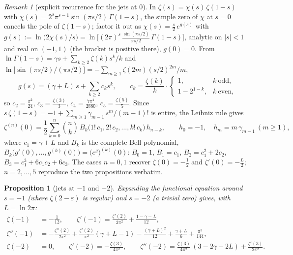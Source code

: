 \documentclass[11pt]{article}
\newtheorem{proposition}[theorem]{Proposition}
\theoremstyle{remark}
\newtheorem{remark}[theorem]{Remark}
\newcommand{\lntwopi}{\ln 2\pi}
\begin{document}
\begin{remark}[explicit recurrence for the jets at $0$]\label{rem:jetrec}
In $\zeta(s)=\chi(s)\,\zeta(1-s)$ with
$\chi(s)=2^s\pi^{s-1}\sin(\pi s/2)\,\Gamma(1-s)$,
the simple zero of $\chi$ at $s=0$ cancels the pole of $\zeta(1-s)$; factor
it out as $\chi(s)=\tfrac{s}{2}\,e^{g(s)}$ with
$g(s):=\ln\bigl(2\chi(s)/s\bigr)
=\ln\bigl[(2\pi)^s\,\tfrac{\sin(\pi s/2)}{\pi s/2}\,\Gamma(1-s)\bigr]$,
analytic on $|s|<1$ and real on $(-1,1)$ (the bracket is positive there),
$g(0)=0$. From $\ln\Gamma(1-s)=\gamma s+\sum_{k\ge2}\zeta(k)s^k/k$ and
$\ln\bigl[\sin(\pi s/2)\big/(\pi s/2)\bigr]=-\sum_{m\ge1}\zeta(2m)(s/2)^{2m}/m$,
\[
g(s)=(\gamma+L)\,s+\sum_{k\ge2}c_k s^k,\qquad
c_k=\frac{\zeta(k)}{k}\cdot\begin{cases}1,&k\ \text{odd},\\
1-2^{1-k},&k\ \text{even},\end{cases}
\]
so $c_2=\tfrac{\pi^2}{24}$, $c_3=\tfrac{\zeta(3)}{3}$,
$c_4=\tfrac{7\pi^4}{2880}$, $c_5=\tfrac{\zeta(5)}{5}$. Since
$s\,\zeta(1-s)=-1+\sum_{m\ge1}\gamma_{m-1}\,s^m/(m-1)!$ is entire, the
Leibniz rule gives
\[
\zeta^{(n)}(0)=\frac12\sum_{k=0}^{n}\binom{n}{k}\,
B_k\bigl(1!\,c_1,2!\,c_2,\dots,k!\,c_k\bigr)\,h_{n-k},
\qquad h_0=-1,\quad h_m=m\,\gamma_{m-1}\ (m\ge1),
\]
where $c_1=\gamma+L$ and $B_k$ is the complete Bell polynomial,
$B_k\bigl(g'(0),\dots,g^{(k)}(0)\bigr)=\bigl(e^{g}\bigr)^{(k)}(0)$: $B_0=1$,
$B_1=c_1$, $B_2=c_1^2+2c_2$, $B_3=c_1^3+6c_1c_2+6c_3$. The cases $n=0,1$
recover $\zeta(0)=-\tfrac12$ and $\zeta'(0)=-\tfrac{L}{2}$; $n=2,\dots,5$
reproduce the two propositions verbatim.
\end{remark}

\begin{proposition}[jets at $-1$ and $-2$]\label{prop:jetsneg}
Expanding the functional equation around $s=-1$ (where $\zeta(2-\varepsilon)$
is regular) and $s=-2$ (a trivial zero) gives, with $L=\lntwopi$:
\begin{align}
\zeta(-1)&=-\tfrac1{12},\qquad
\zeta'(-1)=\frac{\zeta'(2)}{2\pi^2}+\frac{1-\gamma-L}{12},\label{eq:zpm1}\\
\zeta''(-1)&=-\frac{\zeta''(2)}{2\pi^2}+\frac{\zeta'(2)}{\pi^2}(\gamma+L-1)
-\frac{(\gamma+L)^2}{12}+\frac{\gamma+L}{6}+\frac{\pi^2}{144},\label{eq:zppm1}\\
\zeta(-2)&=0,\qquad
\zeta'(-2)=-\frac{\zeta(3)}{4\pi^2},\qquad
\zeta''(-2)=\frac{\zeta(3)}{4\pi^2}\,(3-2\gamma-2L)+\frac{\zeta'(3)}{2\pi^2}.
\label{eq:zm2}
\end{align}
\end{proposition}
\end{document}
